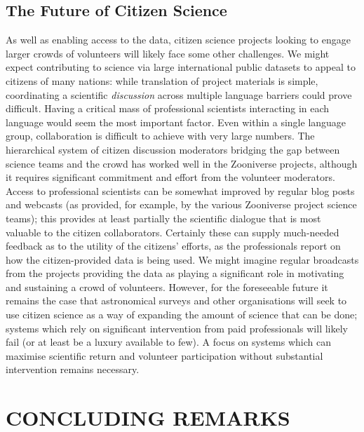 \documentclass{ar2e}
\begin{document}
 


\subsection{The Future of Citizen Science}

As well as enabling access to the data, citizen science projects looking to
engage larger crowds of volunteers will likely face some other  challenges. We
might expect contributing to science via large international public datasets to
appeal to citizens of many nations: while translation of project materials is simple, 
coordinating a scientific \textit{discussion} across multiple language barriers could prove difficult. Having a critical mass of
professional scientists interacting in each language would seem the most
important factor. Even within a single language group, collaboration is
difficult to achieve with  very large numbers. The hierarchical system of
citizen discussion  moderators bridging the gap between science teams and the
crowd has worked well in the Zooniverse projects, although it requires
significant commitment and effort from the volunteer moderators. Access to
professional scientists can be somewhat improved by regular blog posts and 
webcasts (as
provided, for example, by the various Zooniverse project science teams); 
this provides at least
partially the scientific dialogue that is most valuable to the citizen
collaborators. Certainly these can supply much-needed feedback as to the utility
of the citizens' efforts, as the professionals report on how the
citizen-provided data is being used. We might imagine regular broadcasts from
the projects providing the data as playing a significant role in motivating and
sustaining a crowd of volunteers. However, for the foreseeable future it remains the case
that astronomical surveys and other organisations will seek to use citizen science as a 
way of expanding the amount of science that can be done; systems which rely on significant
intervention from paid professionals will likely fail (or at least be a luxury available to few). A
focus on systems which can maximise scientific return and volunteer participation without
substantial intervention remains necessary. 


\section{CONCLUDING REMARKS}
\label{sec:conclusions}
\end{document}
